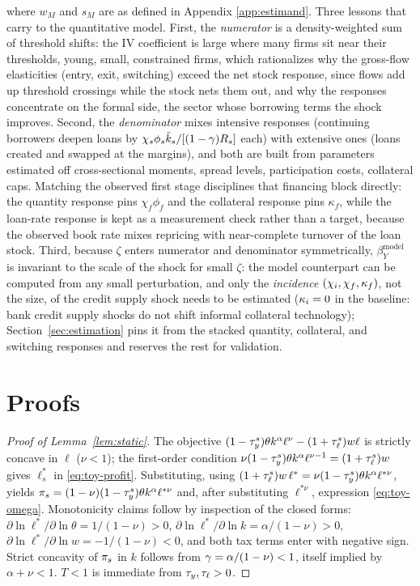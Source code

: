 \documentclass[12pt]{article}
\begin{document}
where $w_M$ and $s_M$ are as defined in Appendix \ref{app:estimand}.
Three lessons that carry to the quantitative model. First, the
\emph{numerator} is a density-weighted sum of threshold shifts: the IV
coefficient is large where many firms sit near their thresholds,
young, small, constrained firms, which rationalizes why the gross-flow elasticities (entry, exit, switching) exceed the net stock response, since flows add up threshold crossings while the stock nets them out, and why the responses concentrate on the formal side, the sector whose borrowing terms the shock improves. Second, the \emph{denominator} mixes intensive responses (continuing
borrowers deepen loans by $\chi_{s}\phi_{s}\tilde
k_{s}/[(1-\gamma)R_{s}]$ each) with extensive ones (loans created
and swapped at the margins), and both are built from parameters
estimated off cross-sectional moments, spread levels,
participation costs, collateral caps. Matching the observed first stage disciplines that financing block directly: the quantity response pins $\chi_{f}\phi_{f}$ and the collateral response pins $\kappa_{f}$, while the loan-rate response is kept as a measurement check rather than a target, because the observed book rate mixes repricing with near-complete turnover of the loan stock. Third, because $\zeta$ enters numerator and
denominator symmetrically, $\beta^{\text{model}}_{Y}$ is invariant to
the scale of the shock for small $\zeta$: the model counterpart can be
computed from any small perturbation, and only the \emph{incidence}
$(\chi_{i},\chi_{f},\kappa_{f})$, not the size, of
the credit supply shock needs to be estimated
($\kappa_{i}=0$ in the baseline: bank credit supply shocks do not
shift informal collateral technology); Section~\ref{sec:estimation}
pins it from the stacked quantity, collateral, and switching responses and reserves the rest for validation.

\section{Proofs}
\label{app:toy-proofs}
 
\begin{proof}[Proof of Lemma~\ref{lem:static}]
The objective
$(1-\tau_{y}^{s})\theta k^{\alpha}\ell^{\nu}-(1+\tau_{\ell}^{s})w\ell$ is
strictly concave in $\ell$ ($\nu<1$); the first-order condition
$\nu(1-\tau_{y}^{s})\theta k^{\alpha}\ell^{\nu-1}=(1+\tau_{\ell}^{s})w$ gives
$\ell^{*}_{s}$ in \eqref{eq:toy-profit}. Substituting, using
$(1+\tau_{\ell}^{s})w\,\ell^{*}=\nu(1-\tau_{y}^{s})\theta k^{\alpha}
\ell^{*\nu}$, yields
$\pi_{s}=(1-\nu)(1-\tau_{y}^{s})\theta k^{\alpha}\ell^{*\nu}$ and, after
substituting $\ell^{*\nu}$, expression \eqref{eq:toy-omega}. Monotonicity
claims follow by inspection of the closed forms:
$\partial\ln\ell^{*}/\partial\ln\theta=1/(1-\nu)>0$,
$\partial\ln\ell^{*}/\partial\ln k=\alpha/(1-\nu)>0$,
$\partial\ln\ell^{*}/\partial\ln w=-1/(1-\nu)<0$, and both tax terms
enter with negative sign. Strict concavity of $\pi_{s}$ in $k$ follows
from $\gamma=\alpha/(1-\nu)<1$, itself implied by $\alpha+\nu<1$.
$T<1$ is immediate from $\tau_{y},\tau_{\ell}>0$.
\end{proof}
 
\end{document}
